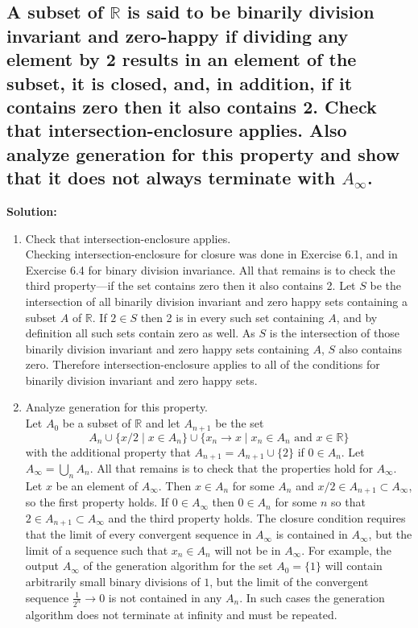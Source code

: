 \documentclass{article}
\newcommand{\exercise}[1]{\subsection{\normalfont #1}}
\newcommand{\solution}{\indent\indent \textbf{Solution: }}
\begin{document}
\exercise{A subset of $\mathbb{R}$ is said to be binarily division invariant and zero-happy if dividing any element by 2 results in an element of the subset, it is closed, and, in addition, if it contains zero then it also contains 2. Check that intersection-enclosure applies. Also analyze generation for this property and show that it does not always terminate with $A_\infty$.}
\solution 
\begin{enumerate}
\item Check that intersection-enclosure applies. \\
Checking intersection-enclosure for closure was done in Exercise 6.1, and in Exercise 6.4 for binary division invariance. All that remains is to check the third property—if the set contains zero then it also contains 2. Let $S$ be the intersection of all binarily division invariant and zero happy sets containing a subset $A$ of $\mathbb{R}$. If $2\in S$ then 2 is in every such set containing $A$, and by definition all such sets contain zero as well. As $S$ is the intersection of those binarily division invariant and zero happy sets containing $A$, $S$ also contains zero. Therefore intersection-enclosure applies to all of the conditions for binarily division invariant and zero happy sets.

\item Analyze generation for this property. \\
Let $A_0$ be a subset of $\mathbb{R}$ and let $A_{n+1}$ be the set $$A_n \cup \{x/2 \mid x\in A_n\} \cup \{ x_n \to x \mid x_n \in A_n \text{ and } x \in \mathbb{R} \}$$ 
with the additional property that $A_{n+1} = A_{n+1} \cup \{2\}$ if $0 \in A_n$. Let $A_\infty = \bigcup_n A_n$. All that remains is to check that the properties hold for $A_\infty$. Let $x$ be an element of $A_\infty$. Then $x\in A_n$ for some $A_n$ and $x/2 \in A_{n+1} \subset A_\infty$, so the first property holds. If $0\in A_\infty$ then $0 \in A_n$ for some $n$ so that $2 \in A_{n+1} \subset A_\infty$ and the third property holds. The closure condition requires that the limit of every convergent sequence in $A_\infty$ is contained in $A_\infty$, but the limit of a sequence such that $x_n \in A_n$ will not be in $A_\infty$. For example, the output $A_\infty$ of the generation algorithm for the set $A_0 = \{1\}$ will contain arbitrarily small binary divisions of $1$, but the limit of the convergent sequence $\frac{1}{2^n}\to 0$ is not contained in any $A_n$. In such cases the generation algorithm does not terminate at infinity and must be repeated. 

\end{enumerate}
\end{document}
